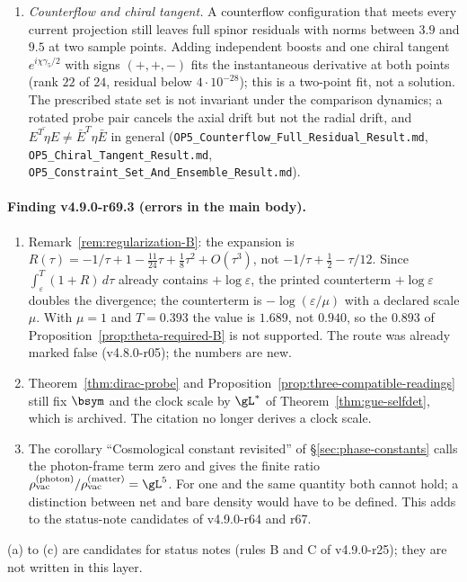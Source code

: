\begin{enumerate}[leftmargin=2em]
reconstructed geometry requires \(b+3tb'=1\) and \((hb^2)'=0\); the second gives \(b=(1\pm\sqrt{10})/9\), the first \(b=1\).  No differentiable profile exists
(\texttt{OP5\_Isotropic\_Connection\_Ward\_NoGo.md}).
\item[(f)] \emph{Counterflow and chiral tangent.}  A counterflow configuration that meets every current projection still leaves full spinor residuals with norms
between \(3.9\) and \(9.5\) at two sample points.  Adding independent boosts and one chiral tangent \(e^{i\chi\gamma_5/2}\) with signs \((+,+,-)\) fits the
instantaneous derivative at both points (rank \(22\) of \(24\), residual below \(4\cdot10^{-28}\)); this is a two-point fit, not a solution.  The prescribed
state set is not invariant under the comparison dynamics; a rotated probe pair cancels the axial drift but not the radial drift, and
\(\overline{E^T\eta E}\neq\bar E^T\eta\bar E\) in general (\texttt{OP5\_Counterflow\_Full\_Residual\_Result.md}, \texttt{OP5\_Chiral\_Tangent\_Result.md},
\texttt{OP5\_Constraint\_Set\_And\_Ensemble\_Result.md}).
\end{enumerate}

\paragraph{Finding v4.9.0-r69.3 (errors in the main body).}
\begin{enumerate}[leftmargin=2em]
\item[(a)] Remark~\ref{rem:regularization-B}: the expansion is \(R(\tau)=-1/\tau+1-\tfrac{11}{24}\tau+\tfrac18\tau^2+O(\tau^3)\), not
\(-1/\tau+\tfrac12-\tau/12\).  Since \(\int_\varepsilon^T(1+R)\,d\tau\) already contains \(+\log\varepsilon\), the printed counterterm \(+\log\varepsilon\) doubles the
divergence; the counterterm is \(-\log(\varepsilon/\mu)\) with a declared scale \(\mu\).  With \(\mu=1\) and \(T=0.393\) the value is \(1.689\), not \(0.940\), so
the \(0.893\) of Proposition~\ref{prop:theta-required-B} is not supported.  The route was already marked false (v4.8.0-r05); the numbers are new.
\item[(b)] Theorem~\ref{thm:dirac-probe} and Proposition~\ref{prop:three-compatible-readings} still fix \(\bsym\) and the clock scale by \(\gL^*\) of
Theorem~\ref{thm:gue-selfdet}, which is archived.  The citation no longer derives a clock scale.
\item[(c)] The corollary ``Cosmological constant revisited'' of \S\ref{sec:phase-constants} calls the photon-frame term zero and gives the finite ratio
\(\rho_{\rm vac}^{(\rm photon)}/\rho_{\rm vac}^{(\rm matter)}=\gL^5\).  For one and the same quantity both cannot hold; a distinction between net and bare
density would have to be defined.  This adds to the status-note candidates of v4.9.0-r64 and r67.
\end{enumerate}
(a) to (c) are candidates for status notes (rules B and C of v4.9.0-r25); they are not written in this layer.

